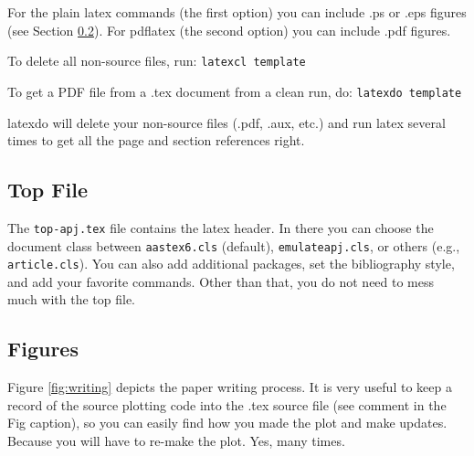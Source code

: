 For the plain latex commands (the first option) you can include .ps or .eps figures (see Section \ref{sec:figures}). For pdflatex (the second option) you can include .pdf figures.

To delete all non-source files, run: \newline
\indent \texttt{latexcl template} \newline

To get a PDF file from a .tex document from a clean run, do: \newline
\indent \texttt{latexdo template} \newline

latexdo will delete your non-source files (.pdf, .aux, etc.) and run latex
several times to get all the page and section references right.


\subsection{Top File}

The \texttt{top-apj.tex} file contains the latex header.  In there you
can choose the document class between \texttt{aastex6.cls} (default),
\texttt{emulateapj.cls}, or others (e.g., \texttt{article.cls}).  You
can also add additional packages, set the bibliography style, and add
your favorite commands.  Other than that, you do not need to mess much
with the top file.


\subsection{Figures}
\label{sec:figures}

Figure \ref{fig:writing} depicts the paper writing process.  It is
very useful to keep a record of the source plotting code into the .tex
source file (see comment in the Fig caption), so you can
easily find how you made the plot and make updates.  Because you will
have to re-make the plot. Yes, many times.

